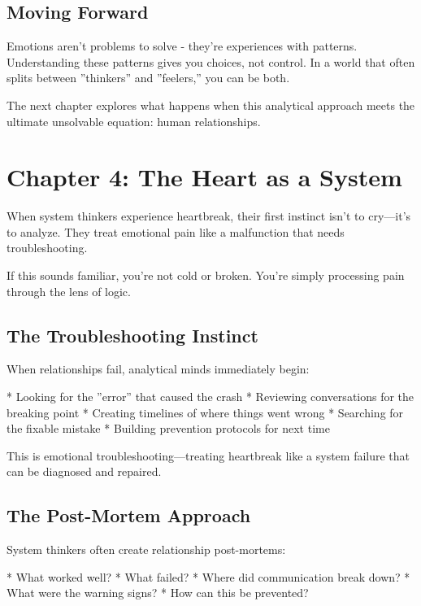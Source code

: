 \documentclass[12pt,oneside]{book}
\begin{document}
\section{Moving Forward}

Emotions aren't problems to solve - they're experiences with patterns. Understanding these patterns gives you choices, not control. In a world that often splits between ''thinkers'' and ''feelers,'' you can be both.

The next chapter explores what happens when this analytical approach meets the ultimate unsolvable equation: human relationships.

\chapter{Chapter 4: The Heart as a System}

When system thinkers experience heartbreak, their first instinct isn't to cry---it's to analyze. They treat emotional pain like a malfunction that needs troubleshooting.

If this sounds familiar, you're not cold or broken. You're simply processing pain through the lens of logic.

\section{The Troubleshooting Instinct}

When relationships fail, analytical minds immediately begin:

                    * Looking for the ''error'' that caused the crash
                    * Reviewing conversations for the breaking point
                    * Creating timelines of where things went wrong
                    * Searching for the fixable mistake
                    * Building prevention protocols for next time

This is emotional troubleshooting---treating heartbreak like a system failure that can be diagnosed and repaired.

\section{The Post-Mortem Approach}

System thinkers often create relationship post-mortems:

                    * What worked well?
                    * What failed?
                    * Where did communication break down?
                    * What were the warning signs?
                    * How can this be prevented?
\end{document}
